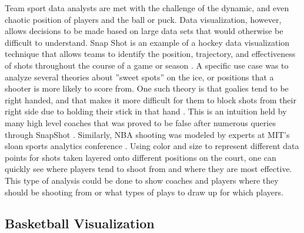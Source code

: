 \documentclass[sigconf]{acmart}
\begin{document}
Team sport data analysts are met with the challenge of the dynamic, and even chaotic position of players and the ball or puck. Data visualization, however, allows decisions to be made based on large data sets that would otherwise be difficult to understand. Snap Shot is an example of a hockey data visualization technique that allows teams to identify the position, trajectory, and effectiveness of shots throughout the course of a game or season \cite{SnapShot}. A specific use case was to analyze several theories about ''sweet spots'' on the ice, or positions that a shooter is more likely to score from. One such theory is that goalies tend to be right handed, and that makes it more difficult for them to block shots from their right side due to holding their stick in that hand \cite{SnapShot}. This is an intuition held by many high level coaches that was proved to be false after numerous queries through SnapShot \cite{SnapShot}. Similarly, NBA shooting was modeled by experts at MIT's sloan sports analytics conference \cite{CourtVision}. Using color and size to represent different data points for shots taken layered onto different positions on the court, one can quickly see where players tend to shoot from and where they are most effective. This type of analysis could be done to show coaches and players where they should be shooting from or what types of plays to draw up for which players.

\subsection{Basketball Visualization}
\end{document}

